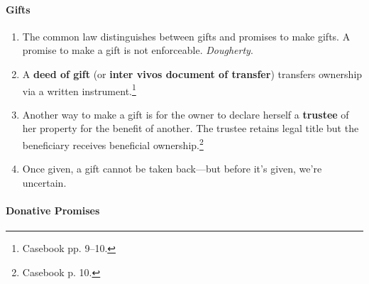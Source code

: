 \paragraph{Gifts}

\begin{enumerate}
    \item The common law distinguishes between gifts and promises to make 
    gifts. A promise to make a gift is not enforceable. \emph{Dougherty}.
    \item A \textbf{deed of gift} (or \textbf{inter vivos document of 
    transfer}) transfers ownership via a written instrument.\footnote{Casebook 
    pp. 9--10.}
    \item Another way to make a gift is for the owner to declare herself a 
    \textbf{trustee} of her property for the benefit of another. The trustee 
    retains legal title but the beneficiary receives beneficial 
    ownership.\footnote{Casebook p. 10.}
    \item Once given, a gift cannot be taken back---but before it's given, 
    we're uncertain.
\end{enumerate}

\paragraph{Donative Promises}

